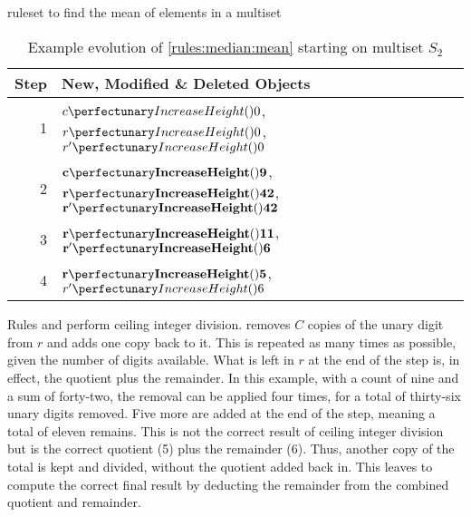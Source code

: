\begin{cprulesetfloat}
\begin{cpruleset}




\end{cpruleset}
\caption{\label{rules:median:mean}\Gls{ruleset} to find the mean of elements in a multiset}
\end{cprulesetfloat}

\begin{table}[htbp]
\centering
  \begin{tabular}{|r|l|}
    \hline
    \textbf{Step} & \textbf{New, Modified \& Deleted Objects} \\ \hline
    1 & \(\cpfunc{c}{0}\), \(\cpfunc{r}{0}\), \(\cpfunc{r'}{0}\)\\ \hline
    2 & \(\mathbf{\cpfunc{c}{9}}\), \(\mathbf{\cpfunc{r}{42}}\), \(\mathbf{\cpfunc{r'}{42}}\)\\ \hline
    3 & \(\mathbf{\cpfunc{r}{11}}\), \(\mathbf{\cpfunc{r'}{6}}\)\\ \hline
    4 & \(\mathbf{\cpfunc{r}{5}}\), \sout{\(\cpfunc{r'}{6}\)}\\ \hline

\end{tabular}
\caption[Example evolution of \cref{rules:median:mean}]{\label{tab:median:mean}Example evolution of \cref{rules:median:mean} starting on multiset \(S_2\)}
\end{table}

Rules  and  perform ceiling integer division.   removes \(C\) copies of the unary digit from \(r\) and adds one copy back to it.  This is repeated as many times as possible, given the number of digits available.  What is left in \(r\) at the end of the step is, in effect, the quotient plus the remainder.  In this example, with a count of nine and a sum of forty-two, the removal can be applied four times, for a total of thirty-six unary digits removed.  Five more are added at the end of the step, meaning a total of eleven remains.  This is not the correct result of ceiling integer division but is the correct quotient (5) plus the remainder (6).  Thus, another copy of the total is kept and divided, without the quotient added back in.  This leaves  to compute the correct final result by deducting the remainder from the combined quotient and remainder.

